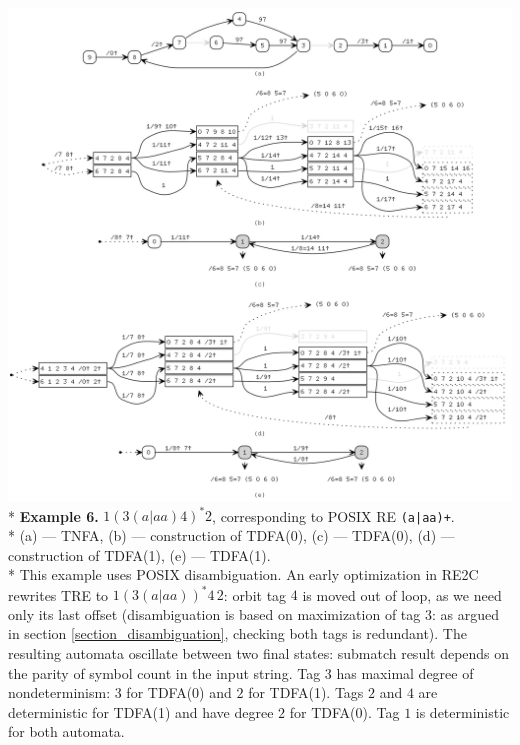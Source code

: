 \documentclass{article}
\newenvironment{Xfig}
    {\par\medskip\noindent\minipage{\linewidth}\begin{center}}
    {\end{center}\endminipage\par\medskip}
\theoremstyle{definition}
\begin{document}
\begin{Xfig}
\includegraphics[width=\linewidth]{img/example4_all.png}\\*
\textbf{Example 6.} $1 (3 (a | aa) 4)^* 2$, corresponding to POSIX RE \texttt{(a|aa)+}.\\*
(a) --- TNFA, (b) --- construction of TDFA(0), (c) --- TDFA(0), (d) --- construction of TDFA(1), (e) --- TDFA(1).\\*
This example uses POSIX disambiguation.
An early optimization in RE2C rewrites TRE to $1 (3 (a | aa) )^* 4 \, 2$:
orbit tag $4$ is moved out of loop, as we need only its last offset
(disambiguation is based on maximization of tag $3$: as argued in section \ref{section_disambiguation}, checking both tags is redundant).
The resulting automata oscillate between two final states:
submatch result depends on the parity of symbol count in the input string.
Tag $3$ has maximal degree of nondeterminism: $3$ for TDFA(0) and $2$ for TDFA(1).
Tags $2$ and $4$ are deterministic for TDFA(1) and have degree $2$ for TDFA(0).
Tag $1$ is deterministic for both automata.
\end{Xfig}
\end{document}
